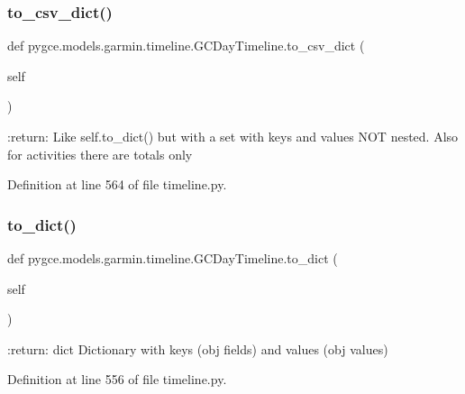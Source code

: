 \subsubsection{\texorpdfstring{to\+\_\+csv\+\_\+dict()}{to\_csv\_dict()}}
{\footnotesize\ttfamily def pygce.\+models.\+garmin.\+timeline.\+G\+C\+Day\+Timeline.\+to\+\_\+csv\+\_\+dict (\begin{DoxyParamCaption}\item[{}]{self }\end{DoxyParamCaption})}

\begin{DoxyVerb}:return: {}
    Like self.to_dict() but with a set with keys and values NOT nested. Also for activities there are totals only
\end{DoxyVerb}
 

Definition at line 564 of file timeline.\+py.

\mbox{\label{classpygce_1_1models_1_1garmin_1_1timeline_1_1_g_c_day_timeline_aea84908a12fe244f70ef0c7d6f9875b7}} 
\subsubsection{\texorpdfstring{to\+\_\+dict()}{to\_dict()}}
{\footnotesize\ttfamily def pygce.\+models.\+garmin.\+timeline.\+G\+C\+Day\+Timeline.\+to\+\_\+dict (\begin{DoxyParamCaption}\item[{}]{self }\end{DoxyParamCaption})}

\begin{DoxyVerb}:return: dict
    Dictionary with keys (obj fields) and values (obj values)
\end{DoxyVerb}
 

Definition at line 556 of file timeline.\+py.

\mbox{\label{classpygce_1_1models_1_1garmin_1_1timeline_1_1_g_c_day_timeline_a45e446687d33554cb53dea0a2d052c1a}} 
